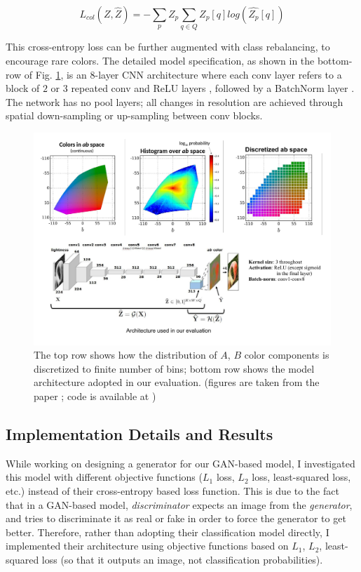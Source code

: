 \documentclass[10pt]{article}
\begin{document}
\[ L_{col}(Z, \hat{Z}) = - \sum_p Z_p \sum_{q \in Q} Z_p[q] log(\hat{Z_p}[q])   \] 

This cross-entropy loss can be further augmented with class rebalancing, to encourage rare colors. The detailed model specification, as shown in the bottom-row of Fig. \ref{fig:col_main}, is an 8-layer CNN architecture where each conv layer refers to a block of $2$ or $3$ repeated
conv and ReLU layers \cite{nair2010rectified}, followed by a BatchNorm layer \cite{ioffe2015batch}. The network has no pool layers; 
all changes in resolution are achieved through spatial down-sampling or up-sampling between conv blocks.


\begin{figure}[h]
\centering
\includegraphics[width=\linewidth]{Figs/9.pdf}
\vspace{-10mm}
\caption{The top row shows how the distribution of $A$, $B$ color components is discretized to finite number of bins; bottom row shows the model architecture adopted in our evaluation. (figures are taken from the paper \cite{zhang2016colorful}; code is available at \cite{ColCol})}
\label{fig:col_main}
\end{figure}  


\subsection{Implementation Details and Results}
While working on designing a generator for our GAN-based model, I investigated this model with different objective functions ($L_1$ loss, $L_2$ loss, least-squared loss, etc.) instead of their cross-entropy based loss function. This is due to the fact that in a GAN-based model, \textit{discriminator} expects an image from the \textit{generator}, 
and tries to discriminate it as real or fake in order to force the generator to get better.  
Therefore, rather than adopting their classification model directly, I implemented their architecture 
using objective functions based on $L_1$, $L_2$, least-squared loss (so that it outputs an image, not classification probabilities). 
\end{document}
